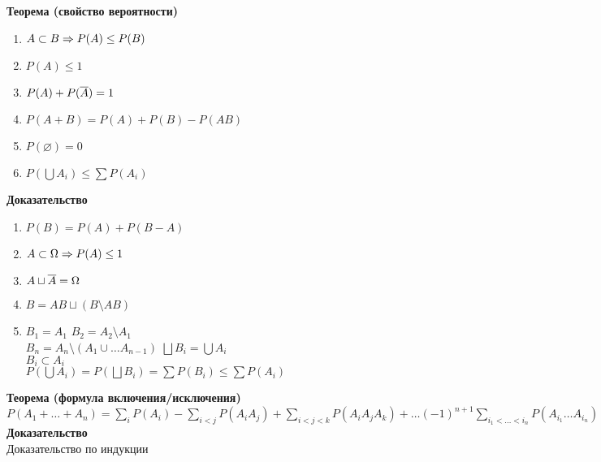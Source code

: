 \documentclass[12pt]{article}
\begin{document}
\textbf{Теорема (свойство вероятности)}
\begin{enumerate}
    \item $A \subset B \Rightarrow P(A) \leq P(B)$
    \item $P(A) \leq 1$
    \item $P(A) + P(\overline A) = 1$
    \item $P(A+B) = P(A) + P(B) - P(AB)$
    \item $P(\varnothing) = 0$
    \item $P(\bigcup A_i) \leq \sum P(A_i)$
\end{enumerate}
\textbf{Доказательство}
\begin{enumerate}
    \item $P(B) = P(A) + P(B - A)$
    \item $A \subset \Omega \Rightarrow P(A) \leq 1$
    \item $A \sqcup \overline A = \Omega$
    \item $B = AB \sqcup (B \setminus AB)$
    \item $B_1 = A_1$
    $B_2 = A_2 \setminus A_1$\\
    $B_n = A_n \setminus (A_1 \cup \ldots A_{n-1})$
    $\bigsqcup B_i = \bigcup A_i$\\
    $B_i \subset A_i$\\
    $P(\bigcup A_i) = P(\bigsqcup B_i) = \sum P(B_i) \leq \sum P(A_i)$
\end{enumerate}
\textbf{Теорема (формула включения/исключения)}\\
$P(A_1 + \ldots + A_n) = \sum_i P(A_i) - \sum_{i < j} P(A_iA_j) + \sum_{i<j<k} P(A_iA_jA_k) + \ldots (-1)^{n+1} \sum_{i_1 < \ldots < i_n} P(A_{i_1} \ldots A_{i_n})$
\textbf{Доказательство}\\
Доказательство по индукции\\
\end{document}
